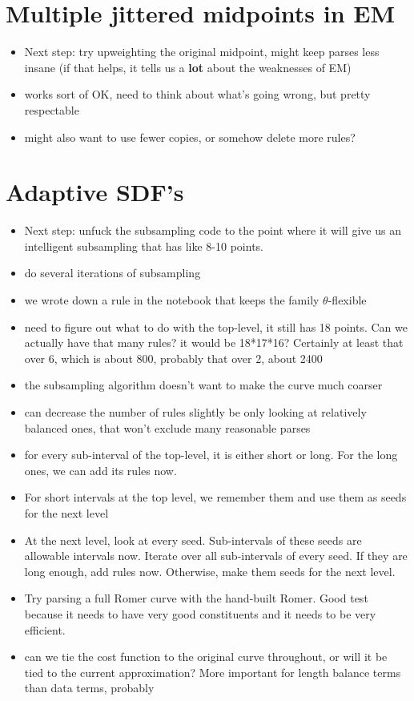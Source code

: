 \documentclass{book}
\begin{document}
\section{Multiple jittered midpoints in EM}
\label{sec-3_1}

\begin{itemize}
\item Next step: try upweighting the original midpoint, might keep parses less
    insane (if that helps, it tells us a \textbf{lot} about the weaknesses of
    EM)
\item works sort of OK, need to think about what's going wrong, but
    pretty respectable
\item might also want to use fewer copies, or somehow delete more rules?
\end{itemize}
\section{Adaptive SDF's}
\label{sec-3_2}


\begin{itemize}
\item Next step: unfuck the subsampling code to the point where it will
    give us an intelligent subsampling that has like 8-10 points.
\item do several iterations of subsampling
\item we wrote down a rule in the notebook that keeps the family
    $\theta$-flexible
\item need to figure out what to do with the top-level, it still has 18
    points. Can we actually have that many rules? it would be
    18*17*16? Certainly at least that over 6, which is about 800,
    probably that over 2, about 2400
\item the subsampling algorithm doesn't want to make the curve much coarser
\end{itemize}
\begin{itemize}
\item can decrease the number of rules slightly be only looking at
    relatively balanced ones, that won't exclude many reasonable
    parses
\item for every sub-interval of the top-level, it is either short or
    long. For the long ones, we can add its rules now.
\item For short intervals at the top level, we remember them and use
    them as seeds for the next level
\item At the next level, look at every seed. Sub-intervals of these
    seeds are allowable intervals now. Iterate over all sub-intervals
    of every seed. If they are long enough, add rules now. Otherwise,
    make them seeds for the next level.
\item Try parsing a full Romer curve with the hand-built Romer. Good
    test because it needs to have very good constituents and it needs
    to be very efficient.
\item can we tie the cost function to the original curve throughout, or
    will it be tied to the current approximation? More important for
    length balance terms than data terms, probably
\end{itemize}
\end{document}
